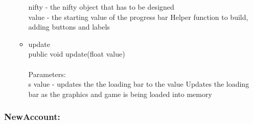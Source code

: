 \documentclass[letterpaper]{article}
\begin{document}
\begin{itemize}
\begin{itemize}
															nifty - the nifty object that has to be designed \\
															value - the starting value of the progress bar Helper function to build, adding buttons and labels
													\item	update \\
															public void update(float value) \\ \\
															Parameters: \\s
															value - updates the the loading bar to the value Updates the loading bar as the graphics and game is being loaded into memory
												\end{itemize}
									\end{itemize}
									
								\subsubsection*{NewAccount:}
								\vspace{0.1in}	
\end{document}
